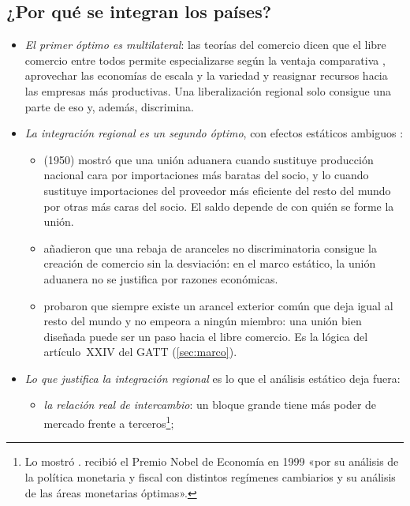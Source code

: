 \documentclass[11pt]{article}
\begin{document}
\subsection{¿Por qué se integran los países?}\label{sec:porque}

\begin{itemize}
\item \emph{El primer óptimo es multilateral}: las teorías del comercio dicen que el libre comercio entre todos permite especializarse según la ventaja comparativa , aprovechar las economías de escala y la variedad  y reasignar recursos hacia las empresas más productivas. Una liberalización regional solo consigue una parte de eso y, además, discrimina.
\item \emph{La integración regional es un segundo óptimo}, con efectos estáticos ambiguos :
  \begin{itemize}
  \item {} (1950) mostró que una unión aduanera  cuando sustituye producción nacional cara por importaciones más baratas del socio, y lo  cuando sustituye importaciones del proveedor más eficiente del resto del mundo por otras más caras del socio\nocite{Viner1950Customs}. El saldo depende de con quién se forme la unión.
  \item \textcite{CooperMassell1965New} añadieron que una rebaja de aranceles no discriminatoria consigue la creación de comercio sin la desviación: en el marco estático, la unión aduanera no se justifica por razones económicas.
  \item \textcite{KempWan1976Elementary} probaron que siempre existe un arancel exterior común que deja igual al resto del mundo y no empeora a ningún miembro: una unión bien diseñada puede ser un paso hacia el libre comercio. Es la lógica del artículo~XXIV del GATT (\ref{sec:marco}).
  \end{itemize}
\item \emph{Lo que justifica la integración regional} es lo que el análisis estático deja fuera:
  \begin{itemize}
  \item \emph{la relación real de intercambio}: un bloque grande tiene más poder de mercado frente a terceros\footnote{Lo mostró \textcite{Mundell1964Tariff}.  recibió el Premio Nobel de Economía en 1999 «por su análisis de la política monetaria y fiscal con distintos regímenes cambiarios y su análisis de las áreas monetarias óptimas»\nocite{Nobel1999Mundell}.};

\end{itemize}
\end{itemize}
\end{document}
